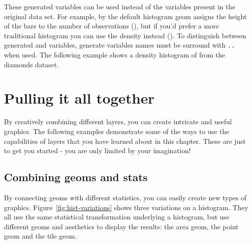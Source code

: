 These generated variables can be used instead of the variables present in the original data set.  For example, by the default histogram geom assigns the height of the bars to the number of observations (), but if you'd prefer a more traditional histogram you can use the density instead ().  To distinguish between generated and variables, generate variables names must be surround with {\tt ..} when used.  The following example shows a density histogram of  from the diamonds dataset.

% 


\section{Pulling it all together}
\label{sec:pull-together}



By creatively combining different layers, you can create intricate and useful graphics.  The following examples demonstrate some of the ways to use the capabilities of layers that you have learned about in this chapter.  These are just to get you started - you are only limited by your imagination!

\subsection{Combining geoms and stats}
\label{sub:new_plot_types}

By connecting geoms with different statistics, you can easily create new types of graphics.  Figure~\ref{fig:hist-variations} shows three variations on a histogram.  They all use the same statistical transformation underlying a histogram, but use different geoms and aesthetics to display the results: the area geom, the point geom and the tile geom.  

% 


